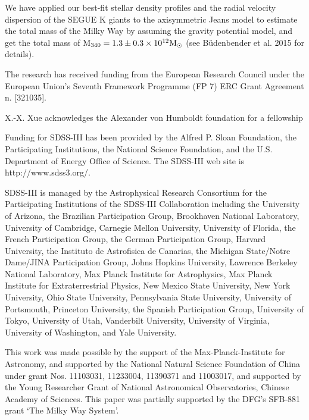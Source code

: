 \documentclass[12pt,preprint]{aastex}
\begin{document}
We have applied our best-fit stellar density profiles and the radial velocity dispersion of the SEGUE K giants to the axisymmetric Jeans model to estimate the total mass of the Milky Way by assuming the gravity potential model, and get the total mass of $\rm M_{340}=1.3\pm0.3\times10^{12}M_\odot$ (see B\"{u}denbender et al. 2015 for details).    

\acknowledgments

The research has received funding from the European Research Council under the European Union's Seventh Framework Programme (FP 7) ERC Grant Agreement n. [321035].

X.-X. Xue acknowledges the Alexander von Humboldt foundation for a fellowship

Funding for SDSS-III has been provided by the Alfred P. Sloan
Foundation, the Participating Institutions, the National Science
Foundation, and the U.S. Department of Energy Office of Science. The
SDSS-III web site is http://www.sdss3.org/.

SDSS-III is managed by the Astrophysical Research Consortium for the
Participating Institutions of the SDSS-III Collaboration including the
University of Arizona, the Brazilian Participation Group, Brookhaven
National Laboratory, University of Cambridge, Carnegie Mellon
University, University of Florida, the French Participation Group, the
German Participation Group, Harvard University, the Instituto de
Astrofisica de Canarias, the Michigan State/Notre Dame/JINA
Participation Group, Johns Hopkins University, Lawrence Berkeley
National Laboratory, Max Planck Institute for Astrophysics, Max Planck
Institute for Extraterrestrial Physics, New Mexico State University,
New York University, Ohio State University, Pennsylvania State
University, University of Portsmouth, Princeton University, the
Spanish Participation Group, University of Tokyo, University of Utah,
Vanderbilt University, University of Virginia, University of
Washington, and Yale University.

This work was made possible by the support of the Max-Planck-Institute
for Astronomy, and supported by the National Natural Science
Foundation of China under grant Nos. 11103031, 11233004, 11390371 and 11003017,
and supported by the Young Researcher Grant of National Astronomical
Observatories, Chinese Academy of Sciences. This paper was partially
supported by the DFG's SFB-881 grant `The Milky Way System'.




\clearpage
\end{document}
